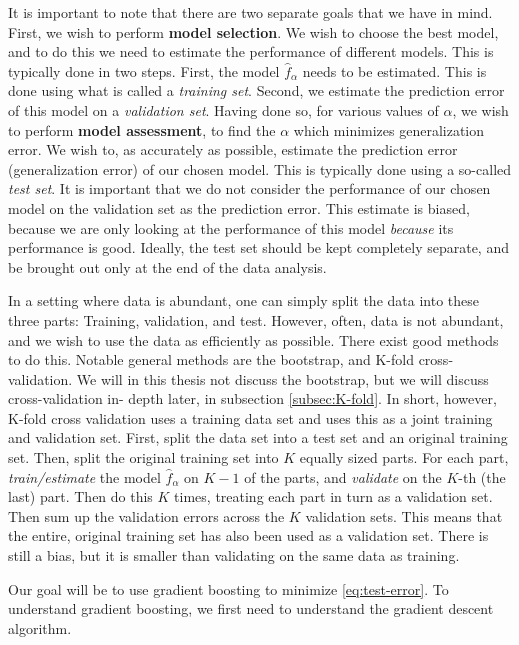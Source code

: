 It is important to note that there are two separate goals that we have in mind.
First, we wish to perform \textbf{model selection}.
We wish to choose the best model, and to do this we need to estimate the performance of different models.
This is typically done in two steps.
First, the model $\hat{f}_\alpha$ needs to be estimated.
This is done using what is called a \textit{training set}.
Second, we estimate the prediction error of this model on a \textit{validation set}.
Having done so, for various values of $\alpha$, we wish to perform \textbf{model assessment}, to find the $\alpha$ which minimizes generalization error.
We wish to, as accurately as possible, estimate the prediction error (generalization error) of our chosen model.
This is typically done using a so-called \textit{test set}.
It is important that we do not consider the performance of our chosen model on the validation set as the prediction error.
This estimate is biased, because we are only looking at the performance of this model \textit{because} its performance is good.
Ideally, the test set should be kept completely separate, and be brought out only at the end of the data analysis.

In a setting where data is abundant, one can simply split the data into these three parts: Training, validation, and test.
However, often, data is not abundant, and we wish to use the data as efficiently as possible.
There exist good methods to do this.
Notable general methods are the bootstrap, and K-fold cross-validation.
We will in this thesis not discuss the bootstrap, but we will discuss cross-validation in- depth later, in subsection \ref{subsec:K-fold}.
In short, however, K-fold cross validation uses a training data set and uses this as a joint training and validation set.
First, split the data set into a test set and an original training set.
Then, split the original training set into $K$ equally sized parts.
For each part, \textit{train/estimate} the model $\hat{f}_\alpha$ on $K-1$ of the parts, and \textit{validate} on the $K$-th (the last) part.
Then do this $K$ times, treating each part in turn as a validation set.
Then sum up the validation errors across the $K$ validation sets.
This means that the entire, original training set has also been used as a validation set.
There is still a bias, but it is smaller than validating on the same data as training. 

Our goal will be to use gradient boosting to minimize \ref{eq:test-error}.
To understand gradient boosting, we first need to understand the gradient descent algorithm.

